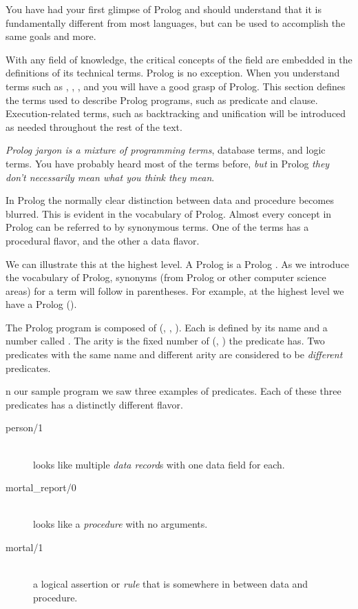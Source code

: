You have had your first glimpse of Prolog and should understand that it is
fundamentally different from most languages, but can be used to accomplish the
same goals and more.


With any field of knowledge, the critical concepts of the field are embedded in
the definitions of its technical terms. Prolog is no exception. When you
understand terms such as , , ,
and  you will have a good grasp of Prolog. This section
defines the terms used to describe Prolog programs, such as predicate and
clause. Execution-related terms, such as backtracking and unification will be
introduced as needed throughout the rest of the text.

\emph{Prolog jargon is a mixture of programming terms}, database terms, and
logic terms. You have probably heard most of the terms before, \emph{but} in
Prolog \emph{they don't necessarily mean what you think they mean}.

In Prolog the normally clear distinction between data and procedure becomes
blurred. This is evident in the vocabulary of Prolog. Almost every concept in
Prolog can be referred to by synonymous terms. One of the terms has a procedural
flavor, and the other a data flavor.

We can illustrate this at the highest level. A Prolog  is a Prolog
. As we introduce the vocabulary of Prolog, synonyms (from
Prolog or other computer science areas) for a term will follow in parentheses.
For example, at the highest level we have a Prolog
 ().

The Prolog program is composed of 
(, , ). Each is defined
by its name and a number called . The arity is the
fixed number of  (, ) the
predicate has. Two predicates with the same name and different arity are
considered to be \emph{different} predicates.

n our sample program we saw three examples of predicates. Each of these three
predicates has a distinctly different flavor.
\begin{description}
\item[person/1]\ \\
looks like multiple \emph{data record}s with one data field for each.
\item[mortal\_report/0]\ \\
looks like a \emph{procedure} with no arguments.
\item[mortal/1]\ \\
a logical assertion or \emph{rule} that is somewhere in between data and
procedure.
\end{description}

